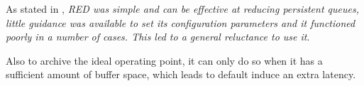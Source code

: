 As stated in \cite{NicholsJacobsonCQD}, \textit{RED was simple and can be
effective at reducing persistent queues, little guidance was available to set
its configuration parameters and it functioned poorly in a number of cases.
This led to a general reluctance to use it}.

Also to archive the ideal operating point, it can only do so when it has a
sufficient amount of buffer space, which leads to default induce an extra
latency.
